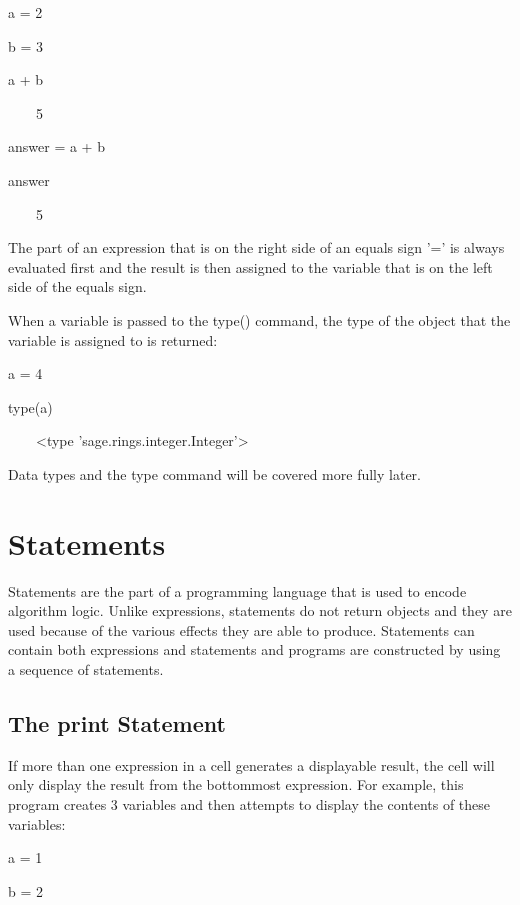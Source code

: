 \documentclass[12pt,oneside]{book}
\begin{document}
a = 2

{\textbar}


b = 3

{\textbar}


a + b

{\textbar}

\ \ \ \ 5


answer = a + b

{\textbar}


answer

{\textbar}

\ \ \ \ 5


The part of an expression that is on the right side of an equals sign '=' is always evaluated first and the result is then assigned to the variable that is on the left side of the equals sign. 

When a variable is passed to the type() command, the type of the object that the variable is assigned to is returned: 

a = 4

type(a)

{\textbar}

\ \ \ \ {\textless}type
'sage.rings.integer.Integer'{\textgreater}


Data types and the type command will be covered more fully later.

\section[Statements]{Statements}

Statements are the part of a programming language that is used to encode algorithm logic. Unlike expressions, statements do not return objects and they are used because of the various effects they are able to produce. Statements can contain both expressions and statements and programs are constructed by using a sequence of statements.

\subsection[The print Statement]{The print Statement}

If more than one expression in a cell generates a displayable result, the cell will only display the result from the bottommost expression. For example, this program creates 3 variables and then attempts to display the contents of these variables: 

a = 1

b = 2
\end{document}

